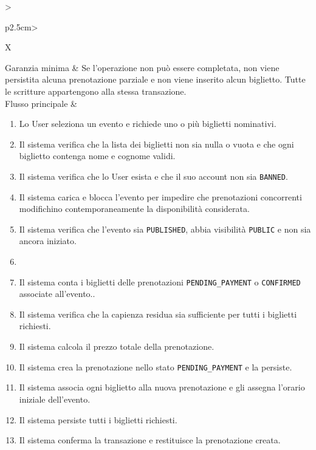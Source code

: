 \begin{tabularx}{\textwidth}{>{\raggedright\arraybackslash\sffamily\bfseries\color{black!75}}p{2.5cm}>{\raggedright\arraybackslash}X}
Garanzia minima & Se l'operazione non può essere completata, non viene persistita alcuna prenotazione parziale e non viene inserito alcun biglietto. Tutte le scritture appartengono alla stessa transazione. \\[1pt] \hline
Flusso principale & \begin{minipage}[t]{\linewidth}\begin{enumerate}[leftmargin=1.4em,nosep,label=\arabic*.]
\item Lo User seleziona un evento e richiede uno o più biglietti nominativi.
\item Il sistema verifica che la lista dei biglietti non sia nulla o vuota e che ogni biglietto contenga nome e cognome validi.
\item Il sistema verifica che lo User esista e che il suo account non sia \texttt{BANNED}.
\item Il sistema carica e blocca l'evento per impedire che prenotazioni concorrenti modifichino contemporaneamente la disponibilità considerata.
\item Il sistema verifica che l'evento sia \texttt{PUBLISHED}, abbia visibilità \texttt{PUBLIC} e non sia ancora iniziato.
\item \item Il sistema conta i biglietti delle prenotazioni \texttt{PENDING\_PAYMENT} o \texttt{CONFIRMED} associate all'evento..
\item Il sistema verifica che la capienza residua sia sufficiente per tutti i biglietti richiesti.
\item Il sistema calcola il prezzo totale della prenotazione.
\item Il sistema crea la prenotazione nello stato \texttt{PENDING\_\allowbreak{}PAYMENT} e la persiste.
\item Il sistema associa ogni biglietto alla nuova prenotazione e gli assegna l'orario iniziale dell'evento.
\item Il sistema persiste tutti i biglietti richiesti.
\item Il sistema conferma la transazione e restituisce la prenotazione creata.
\end{enumerate}\vspace{3pt}\end{minipage} \\[1pt] \hline

\end{tabularx}

